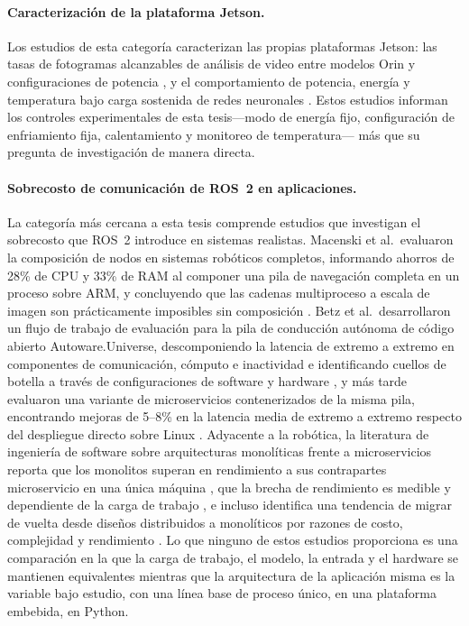 \paragraph{Caracterización de la plataforma Jetson.}
Los estudios de esta categoría caracterizan las propias plataformas Jetson:
las tasas de fotogramas alcanzables de análisis de video entre modelos Orin
y configuraciones de potencia \cite{scalcon2024}, y el comportamiento de
potencia, energía y temperatura bajo carga sostenida de redes neuronales
\cite{zequn2026}. Estos estudios informan los controles experimentales de
esta tesis---modo de energía fijo, configuración de enfriamiento fija,
calentamiento y monitoreo de temperatura--- más que su pregunta de
investigación de manera directa.

\paragraph{Sobrecosto de comunicación de ROS~2 en aplicaciones.}
La categoría más cercana a esta tesis comprende estudios que investigan el
sobrecosto que ROS~2 introduce en sistemas realistas. Macenski et al.\
evaluaron la composición de nodos en sistemas robóticos completos,
informando ahorros de 28\% de CPU y 33\% de RAM al componer una pila de
navegación completa en un proceso sobre ARM, y concluyendo que las cadenas
multiproceso a escala de imagen son prácticamente imposibles sin composición
\cite{macenski2023}. Betz et al.\ desarrollaron un flujo de trabajo de
evaluación para la pila de conducción autónoma de código abierto
Autoware.Universe, descomponiendo la latencia de extremo a extremo en
componentes de comunicación, cómputo e inactividad e identificando cuellos
de botella a través de configuraciones de software y hardware
\cite{betz2023a}, y más tarde evaluaron una variante de microservicios
contenerizados de la misma pila, encontrando mejoras de 5--8\% en la
latencia media de extremo a extremo respecto del despliegue directo sobre
Linux \cite{betz2024}. Adyacente a la robótica, la literatura de ingeniería
de software sobre arquitecturas monolíticas frente a microservicios reporta
que los monolitos superan en rendimiento a sus contrapartes microservicio en
una única máquina \cite{blinowski2022}, que la brecha de rendimiento es
medible y dependiente de la carga de trabajo \cite{tapia2020}, e incluso
identifica una tendencia de migrar de vuelta desde diseños distribuidos a
monolíticos por razones de costo, complejidad y rendimiento
\cite{felisberto2024}. Lo que ninguno de estos estudios proporciona es una
comparación en la que la carga de trabajo, el modelo, la entrada y el
hardware se mantienen equivalentes mientras que la arquitectura de la
aplicación misma es la variable bajo estudio, con una línea base de proceso
único, en una plataforma embebida, en Python.

